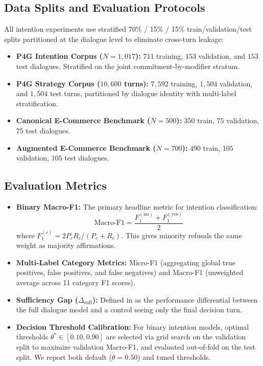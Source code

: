 \subsection{Data Splits and Evaluation Protocols}
All intention experiments use stratified 70\% / 15\% / 15\% train/validation/test splits partitioned at the dialogue level to eliminate cross-turn leakage:
\begin{itemize}
  \item \textbf{P4G Intention Corpus ($N=1{,}017$):} $711$ training, $153$ validation, and $153$ test dialogues. Stratified on the joint commitment-by-modifier stratum.
  \item \textbf{P4G Strategy Corpus ($10{,}600$ turns):} $7{,}592$ training, $1{,}504$ validation, and $1{,}504$ test turns, partitioned by dialogue identity with multi-label stratification.
  \item \textbf{Canonical E-Commerce Benchmark ($N=500$):} $350$ train, $75$ validation, $75$ test dialogues.
  \item \textbf{Augmented E-Commerce Benchmark ($N=700$):} $490$ train, $105$ validation, $105$ test dialogues.
\end{itemize}

\subsection{Evaluation Metrics}
\begin{itemize}
  \item \textbf{Binary Macro-F1:} The primary headline metric for intention classification:
    \begin{equation}
      \text{Macro-F1} = \frac{F_1^{(\text{no})} + F_1^{(\text{yes})}}{2}
    \end{equation}
    where $F_1^{(c)} = 2 P_c R_c / (P_c + R_c)$. This gives minority refusals the same weight as majority affirmations.
  \item \textbf{Multi-Label Category Metrics:} Micro-F1 (aggregating global true positives, false positives, and false negatives) and Macro-F1 (unweighted average across 11 category F1 scores).
  \item \textbf{Sufficiency Gap ($\Delta_{\text{suff}}$):} Defined in  as the performance differential between the full dialogue model and a control seeing only the final decision turn.
  \item \textbf{Decision Threshold Calibration:} For binary intention models, optimal thresholds $\theta^* \in [0.10, 0.90]$ are selected via grid search on the validation split to maximize validation Macro-F1, and evaluated out-of-fold on the test split. We report both default ($\theta=0.50$) and tuned thresholds.
\end{itemize}

